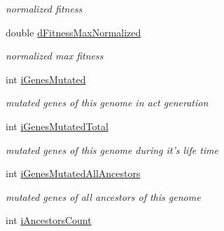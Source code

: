 \begin{DoxyCompactItemize}
\begin{DoxyCompactList}\small\item\em normalized fitness \item\end{DoxyCompactList}\item 
\hypertarget{classCGenome_ad7aa4f19b6c908bade8de233f9080390}{
double \hyperlink{classCGenome_ad7aa4f19b6c908bade8de233f9080390}{dFitnessMaxNormalized}}
\label{classCGenome_ad7aa4f19b6c908bade8de233f9080390}

\begin{DoxyCompactList}\small\item\em normalized max fitness \item\end{DoxyCompactList}\item 
\hypertarget{classCGenome_a762f920595d3aa46c2ffa42da39b0771}{
int \hyperlink{classCGenome_a762f920595d3aa46c2ffa42da39b0771}{iGenesMutated}}
\label{classCGenome_a762f920595d3aa46c2ffa42da39b0771}

\begin{DoxyCompactList}\small\item\em mutated genes of this genome in act generation \item\end{DoxyCompactList}\item 
\hypertarget{classCGenome_ac2c7add5ee1ba58d6ac8fd2996d86aa2}{
int \hyperlink{classCGenome_ac2c7add5ee1ba58d6ac8fd2996d86aa2}{iGenesMutatedTotal}}
\label{classCGenome_ac2c7add5ee1ba58d6ac8fd2996d86aa2}

\begin{DoxyCompactList}\small\item\em mutated genes of this genome during it's life time \item\end{DoxyCompactList}\item 
\hypertarget{classCGenome_a733ad690a9bea7a454fd66815727ecae}{
int \hyperlink{classCGenome_a733ad690a9bea7a454fd66815727ecae}{iGenesMutatedAllAncestors}}
\label{classCGenome_a733ad690a9bea7a454fd66815727ecae}

\begin{DoxyCompactList}\small\item\em mutated genes of all ancestors of this genome \item\end{DoxyCompactList}\item 
\hypertarget{classCGenome_ab58a779d5c4cf3c01bda8d5398fdf662}{
int \hyperlink{classCGenome_ab58a779d5c4cf3c01bda8d5398fdf662}{iAncestorsCount}}
\label{classCGenome_ab58a779d5c4cf3c01bda8d5398fdf662}


\end{DoxyCompactItemize}
